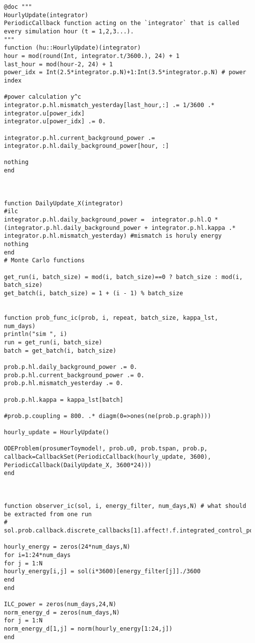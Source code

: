 \begin{lstlisting}
@doc """
HourlyUpdate(integrator)
PeriodicCallback function acting on the `integrator` that is called every simulation hour (t = 1,2,3...).
"""
function (hu::HourlyUpdate)(integrator)
hour = mod(round(Int, integrator.t/3600.), 24) + 1
last_hour = mod(hour-2, 24) + 1
power_idx = Int(2.5*integrator.p.N)+1:Int(3.5*integrator.p.N) # power index

#power calculation y^c
integrator.p.hl.mismatch_yesterday[last_hour,:] .= 1/3600 .* integrator.u[power_idx]
integrator.u[power_idx] .= 0.

integrator.p.hl.current_background_power .= integrator.p.hl.daily_background_power[hour, :]

nothing
end



function DailyUpdate_X(integrator)
#ilc
integrator.p.hl.daily_background_power =  integrator.p.hl.Q * (integrator.p.hl.daily_background_power + integrator.p.hl.kappa .* integrator.p.hl.mismatch_yesterday) #mismatch is horuly energy
nothing
end
# Monte Carlo functions

get_run(i, batch_size) = mod(i, batch_size)==0 ? batch_size : mod(i, batch_size)
get_batch(i, batch_size) = 1 + (i - 1) % batch_size


function prob_func_ic(prob, i, repeat, batch_size, kappa_lst, num_days)
println("sim ", i)
run = get_run(i, batch_size)
batch = get_batch(i, batch_size)

prob.p.hl.daily_background_power .= 0.
prob.p.hl.current_background_power .= 0.
prob.p.hl.mismatch_yesterday .= 0.

prob.p.hl.kappa = kappa_lst[batch]

#prob.p.coupling = 800. .* diagm(0=>ones(ne(prob.p.graph)))

hourly_update = HourlyUpdate()

ODEProblem(prosumerToymodel!, prob.u0, prob.tspan, prob.p,
callback=CallbackSet(PeriodicCallback(hourly_update, 3600),
PeriodicCallback(DailyUpdate_X, 3600*24)))
end



function observer_ic(sol, i, energy_filter, num_days,N) # what should be extracted from one run
# sol.prob.callback.discrete_callbacks[1].affect!.f.integrated_control_power_history

hourly_energy = zeros(24*num_days,N)
for i=1:24*num_days
for j = 1:N
hourly_energy[i,j] = sol(i*3600)[energy_filter[j]]./3600
end
end

ILC_power = zeros(num_days,24,N)
norm_energy_d = zeros(num_days,N)
for j = 1:N
norm_energy_d[1,j] = norm(hourly_energy[1:24,j])
end


\end{lstlisting}
